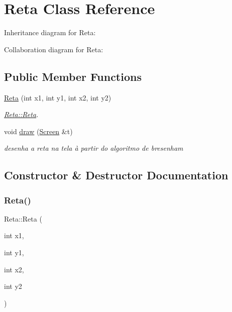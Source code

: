 \hypertarget{classReta}{}\section{Reta Class Reference}
\label{classReta}


Inheritance diagram for Reta\+:


Collaboration diagram for Reta\+:
\subsection*{Public Member Functions}
\begin{DoxyCompactItemize}
\item 
\hyperlink{classReta_aa5d7a9cab70189356fc553bbb0a17fcd}{Reta} (int x1, int y1, int x2, int y2)
\begin{DoxyCompactList}\small\item\em \hyperlink{classReta_aa5d7a9cab70189356fc553bbb0a17fcd}{Reta\+::\+Reta}. \end{DoxyCompactList}\item 
void \hyperlink{classReta_ac2e9805183cd474b62bffd8b032cd780}{draw} (\hyperlink{classScreen}{Screen} \&t)
\begin{DoxyCompactList}\small\item\em desenha a reta na tela à partir do algoritmo de bresenham \end{DoxyCompactList}\end{DoxyCompactItemize}


\subsection{Constructor \& Destructor Documentation}
\mbox{\label{classReta_aa5d7a9cab70189356fc553bbb0a17fcd}} 
\subsubsection{\texorpdfstring{Reta()}{Reta()}}
{\footnotesize\ttfamily Reta\+::\+Reta (\begin{DoxyParamCaption}\item[{int}]{x1,  }\item[{int}]{y1,  }\item[{int}]{x2,  }\item[{int}]{y2 }\end{DoxyParamCaption})}



